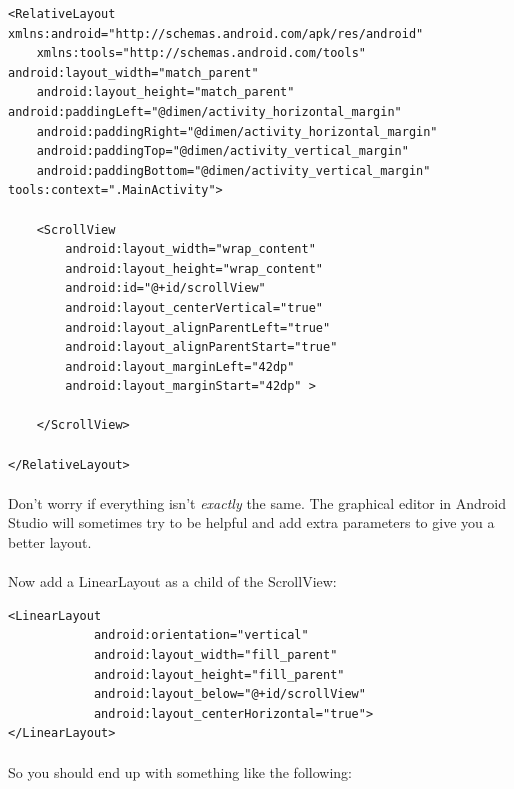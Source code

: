 \begin{lstlisting}
<RelativeLayout xmlns:android="http://schemas.android.com/apk/res/android"
    xmlns:tools="http://schemas.android.com/tools" android:layout_width="match_parent"
    android:layout_height="match_parent" android:paddingLeft="@dimen/activity_horizontal_margin"
    android:paddingRight="@dimen/activity_horizontal_margin"
    android:paddingTop="@dimen/activity_vertical_margin"
    android:paddingBottom="@dimen/activity_vertical_margin" tools:context=".MainActivity">

    <ScrollView
        android:layout_width="wrap_content"
        android:layout_height="wrap_content"
        android:id="@+id/scrollView"
        android:layout_centerVertical="true"
        android:layout_alignParentLeft="true"
        android:layout_alignParentStart="true"
        android:layout_marginLeft="42dp"
        android:layout_marginStart="42dp" >
         
    </ScrollView>

</RelativeLayout>
\end{lstlisting}
\paragraph{} Don't worry if everything isn't \emph{exactly} the same. The graphical editor in Android Studio will sometimes try to be helpful and add extra parameters to give you a better layout.

\paragraph{} Now add a LinearLayout as a child of the ScrollView:

\begin{lstlisting}
<LinearLayout
            android:orientation="vertical"
            android:layout_width="fill_parent"
            android:layout_height="fill_parent"
            android:layout_below="@+id/scrollView"
            android:layout_centerHorizontal="true">
</LinearLayout>
\end{lstlisting}

\paragraph{} So you should end up with something like the following:

